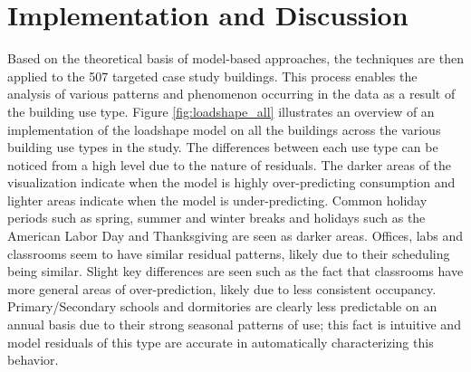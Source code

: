 \section{Implementation and Discussion}
\label{sec:modelbaseddiscussion}
Based on the theoretical basis of model-based approaches, the techniques are then applied to the 507 targeted case study buildings. This process enables the analysis of various patterns and phenomenon occurring in the data as a result of the building use type. Figure \ref{fig:loadshape_all} illustrates an overview of an implementation of the loadshape model on all the buildings across the various building use types in the study. The differences between each use type can be noticed from a high level due to the nature of residuals. The darker areas of the visualization indicate when the model is highly over-predicting consumption and lighter areas indicate when the model is under-predicting. Common holiday periods such as spring, summer and winter breaks and holidays such as the American Labor Day and Thanksgiving are seen as darker areas. Offices, labs and classrooms seem to have similar residual patterns, likely due to their scheduling being similar. Slight key differences are seen such as the fact that classrooms have more general areas of over-prediction, likely due to less consistent occupancy. Primary/Secondary schools and dormitories are clearly less predictable on an annual basis due to their strong seasonal patterns of use; this fact is intuitive and model residuals of this type are accurate in automatically characterizing this behavior.

